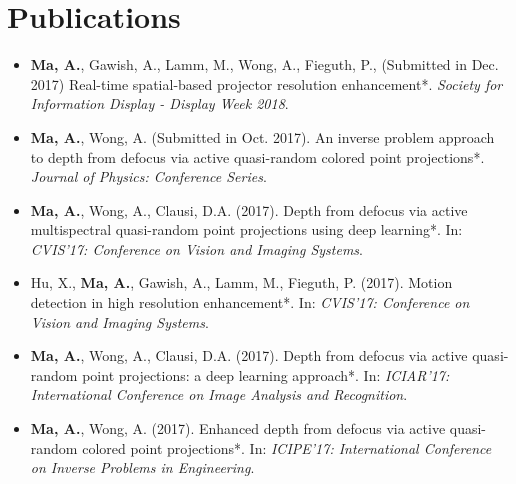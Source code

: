 \section*{Publications}
    \vspace{\postsubhead}
    \begin{adjustwidth}{\indentleft}{\indentright}
        \begin{itemize}
        
            \item \textbf{Ma, A.}, Gawish, A., Lamm, M., Wong, A., Fieguth, P., (Submitted in Dec. 2017) Real-time spatial-based projector resolution enhancement*. \emph{Society for Information Display - Display Week 2018}.
            
            \item \textbf{Ma, A.}, Wong, A. (Submitted in Oct. 2017). An inverse problem approach to depth from defocus via active quasi-random colored point projections*. \emph{Journal of Physics: Conference Series}.
            
            \item \textbf{Ma, A.}, Wong, A., Clausi, D.A. (2017). Depth from defocus via active multispectral quasi-random point projections using deep learning*. In: \emph{CVIS'17: Conference on Vision and Imaging Systems}.
           
            \item Hu, X., \textbf{Ma, A.}, Gawish, A., Lamm, M., Fieguth, P. (2017). Motion detection in high resolution enhancement*. In: \emph{CVIS'17: Conference on Vision and Imaging Systems}.
            
            \item \textbf{Ma, A.}, Wong, A., Clausi, D.A. (2017). Depth from defocus via active quasi-random point projections: a deep learning approach*. In: \emph{ICIAR'17: International Conference on Image Analysis and Recognition}.
            
            \item \textbf{Ma, A.}, Wong, A. (2017). Enhanced depth from defocus via active quasi-random colored point projections*. In: \emph{ICIPE'17: International Conference on Inverse Problems in Engineering}.
                   

\end{itemize}
\end{adjustwidth}
